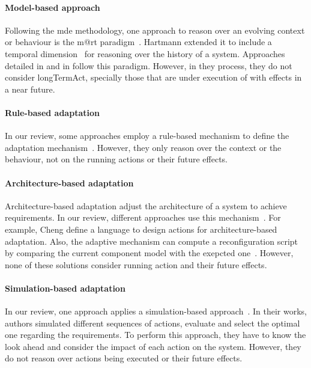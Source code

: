 \paragraph{Model-based approach}
Following the \gls{mde} methodology, one approach to reason over an evolving context or \gls{behaviour} is the \gls{m@rt} paradigm~\cite{DBLP:journals/computer/BlairBF09, DBLP:journals/computer/MorinBJFS09}.
Hartmann \etal extended it to include a temporal dimension~\cite{DBLP:conf/seke/0001FNMKT14, DBLP:conf/models/0001FNMKBT14} for reasoning over the history of a system.
Approaches detailed in \cite{DBLP:conf/icse/BarbosaLMJ17} and in \cite{DBLP:conf/icse/ChenPYNZ14} follow this paradigm.
However, in they process, they do not consider \gls{longTermAct}, specially those that are under execution of with effects in a near future.

\paragraph{Rule-based adaptation}
In our review, some approaches employ a rule-based mechanism to define the adaptation mechanism~\cite{DBLP:conf/icse/ArcainiRS15, DBLP:conf/icse/TaharaOH17, DBLP:conf/eurosys/GraceHPBCT08}.
However, they only reason over the context or the behaviour, not on the running actions or their future effects.

\paragraph{Architecture-based adaptation}
Architecture-based adaptation adjust the architecture of a system to achieve requirements.
In our review, different approaches use this mechanism~\cite{DBLP:journals/jss/ChengG12, DBLP:journals/computer/GarlanCHSS04, DBLP:journals/computer/GeorgasHT09, DBLP:conf/cbse/FouquetMFBPJ12}.
For example, Cheng \etal define a language to design \glspl{action} for architecture-based adaptation.
Also, the adaptive mechanism can compute a reconfiguration script by comparing the current component model with the exepcted one~\cite{DBLP:conf/cbse/FouquetMFBPJ12}.
However, none of these solutions consider running \gls{action} and their future effects.

\paragraph{Simulation-based adaptation}
In our review, one approach applies a simulation-based approach~\cite{DBLP:conf/smartgridsec/0001FKNT14}.
In their works, authors simulated different sequences of \glspl{action}, evaluate and select the optimal one regarding the requirements.
To perform this approach, they have to know the look ahead and consider the impact of each action on the system.
However, they do not reason over \glspl{action} being executed or their future effects.
	
